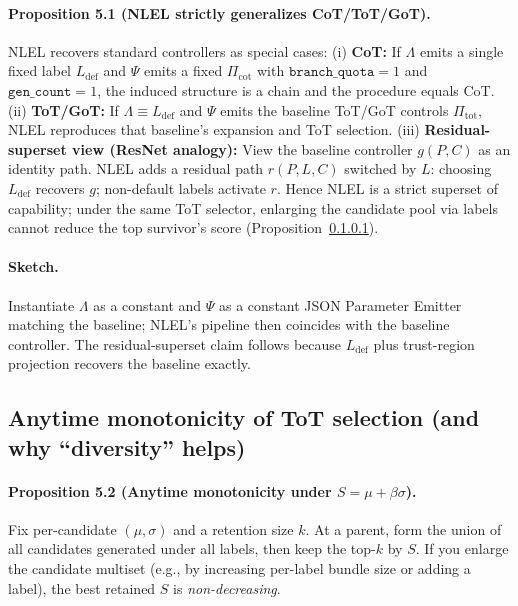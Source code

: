 \documentclass{article}
\theoremstyle{plain}
\theoremstyle{definition}
\theoremstyle{remark}
\begin{document}
\paragraph{Proposition 5.1 (NLEL strictly generalizes CoT/ToT/GoT).}
NLEL recovers standard controllers as special cases:
(i) \textbf{CoT:} If $\Lambda$ emits a single fixed label $L_{\text{def}}$ and $\Psi$ emits a fixed $\Pi_{\text{cot}}$ with $\texttt{branch\_quota}=1$ and $\texttt{gen\_count}=1$, the induced structure is a chain and the procedure equals CoT.
(ii) \textbf{ToT/GoT:} If $\Lambda\equiv L_{\text{def}}$ and $\Psi$ emits the baseline ToT/GoT controls $\Pi_{\text{tot}}$, NLEL reproduces that baseline's expansion and ToT selection.
(iii) \textbf{Residual-superset view (ResNet analogy):} View the baseline controller $g(P,C)$ as an identity path. NLEL adds a residual path $r(P,L,C)$ switched by $L$: choosing $L_{\text{def}}$ recovers $g$; non-default labels activate $r$. Hence NLEL is a strict superset of capability; under the same ToT selector, enlarging the candidate pool via labels cannot reduce the top survivor's score (Proposition~\ref{prop:anytime}).

\paragraph{Sketch.}
Instantiate $\Lambda$ as a constant and $\Psi$ as a constant JSON Parameter Emitter matching the baseline; NLEL's pipeline then coincides with the baseline controller. The residual-superset claim follows because $L_{\text{def}}$ plus trust-region projection recovers the baseline exactly.

\subsection{Anytime monotonicity of ToT selection (and why ``diversity'' helps)}
\label{sec:anytime}

\paragraph{Proposition 5.2 (Anytime monotonicity under $S=\mu+\beta\sigma$).}\label{prop:anytime}
Fix per-candidate $(\mu,\sigma)$ and a retention size $k$. 
At a parent, form the union of all candidates generated under all labels, then keep the top-$k$ by $S$. 
If you enlarge the candidate multiset (e.g., by increasing per-label bundle size or adding a label), the best retained $S$ is \emph{non-decreasing}.
\end{document}
